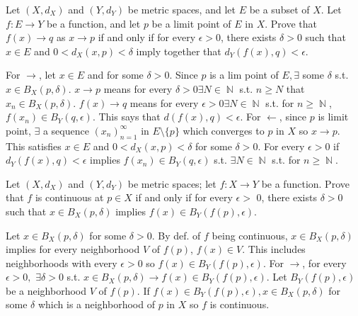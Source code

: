 \documentclass[12pt,letterpaper,boxed]{hmcpset}
\DeclareMathOperator{\N}{\mathbb{N}}
\begin{document}

\begin{problem}[Exercise 1.2]
Let $(X, d_X)$ and $(Y, d_Y)$ be metric spaces, and let $E$ be a subset of $X$. Let $f : E \rightarrow Y$ be a function, and let $p$ be a limit point of $E$ in $X$. Prove that $f(x) \rightarrow q$ as $x\rightarrow p$ if and only if for every $\epsilon > 0$, there exists $\delta > 0$ such that $x \in E$ and $0 < d_X(x,p) < \delta$ imply together that $d_Y(f(x), q) < \epsilon.$
\end{problem}

\begin{solution}
For $\rightarrow$, let $x\in E$ and for some $\delta > 0$. Since $p$ is a lim point of $E, \exists$ some $\delta$ s.t. $x\in B_X(p, \delta)$. $x\rightarrow p$ means for every $\delta > 0 \exists N \in \N$ s.t. $n \ge N$ that $x_n \in B_X(p, \delta)$. $f(x) \rightarrow q$ means for every $\epsilon > 0 \exists N \in \N$ s.t. for $n \ge \N$, $f(x_n)\in B_Y(q, \epsilon)$. This says that $d(f(x), q) < \epsilon.$ For $\leftarrow$, since $p$ is limit point, $\exists$ a sequence $(x_n)_{n=1}^{\infty}$ in $E\setminus\{p\}$ which converges to $p$ in $X$ so $x\rightarrow p.$ This satisfies $x \in E$ and $0 < d_X(x,p) < \delta$ for some $\delta > 0.$ For every $\epsilon > 0$ if $d_Y(f(x), q) < \epsilon$ implies $f(x_n)\in B_Y(q, \epsilon)$ s.t.  $\exists N \in \N$ s.t. for $n \ge \N$.
\end{solution}

\begin{problem}[Exercise 2.2]
Let $(X, d_X)$ and $(Y, d_Y)$ be metric spaces; let $f : X \rightarrow Y$ be a function. Prove that $f$ is continuous at $p\in X$ if and only if for every $\epsilon >$  0, there exists $\delta > 0$ such that $x \in B_X(p,\delta)$ implies $f(x)\in B_Y(f(p), \epsilon)$.
\end{problem}

\begin{solution}
Let $x\in B_X(p,\delta)$ for some $\delta > 0.$ By def. of $f$ being continuous, $x\in B_X(p,\delta)$ implies for every neighborhood $V$ of $f(p)$, $f(x)\in V.$ This includes neighborhoods with every $\epsilon > 0$ so $f(x) \in B_Y(f(p), \epsilon)$. For $\rightarrow$, for every $\epsilon > 0,$ $\exists \delta > 0$ s.t. $x\in B_X(p, \delta)\rightarrow f(x)\in B_Y(f(p), \epsilon)$. Let $B_Y(f(p), \epsilon)$ be a neighborhood $V$ of $f(p)$. If $f(x)\in B_Y(f(p),\epsilon), x\in B_X(p,\delta)$ for some $\delta$ which is a neighborhood of $p$ in $X$ so $f$ is continuous.
\end{solution}
\end{document}
